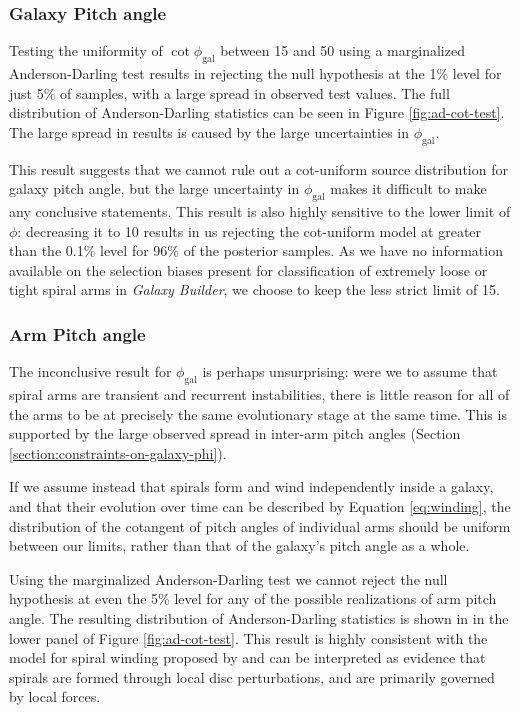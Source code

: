 \subsubsection{Galaxy Pitch angle}

Testing the uniformity of $\cot\phi_\mathrm{gal}$ between {15\degree} and {50\degree} using a marginalized Anderson-Darling test results in rejecting the null hypothesis at the 1\% level for just 5\% of samples, with a large spread in observed test values. The full distribution of Anderson-Darling statistics can be seen in Figure \ref{fig:ad-cot-test}. The large spread in results is caused by the large uncertainties in $\phi_\mathrm{gal}$.

This result suggests that we cannot rule out a cot-uniform source distribution for galaxy pitch angle, but the large uncertainty in $\phi_\mathrm{gal}$ makes it difficult to make any conclusive statements. This result is also highly sensitive to the lower limit of $\phi$: decreasing it to {10\degree} results in us rejecting the cot-uniform model at greater than the 0.1\% level for 96\% of the posterior samples. As we have no information available on the selection biases present for classification of extremely loose or tight spiral arms in \textit{Galaxy Builder}, we choose to keep the less strict limit of {15\degree}.

\subsubsection{Arm Pitch angle}
The inconclusive result for $\phi_\mathrm{gal}$ is perhaps unsurprising: were we to assume that spiral arms are transient and recurrent instabilities, there is little reason for all of the arms to be at precisely the same evolutionary stage at the same time. This is supported by the large observed spread in inter-arm pitch angles (Section \ref{section:constraints-on-galaxy-phi}).

If we assume instead that spirals form and wind independently inside a galaxy, and that their evolution over time can be described by Equation \ref{eq:winding}, the distribution of the cotangent of pitch angles of individual arms should be uniform between our limits, rather than that of the galaxy's pitch angle as a whole.

Using the marginalized Anderson-Darling test we cannot reject the null hypothesis at even the 5\% level for any of the possible realizations of arm pitch angle. The resulting distribution of Anderson-Darling statistics is shown in in the lower panel of Figure \ref{fig:ad-cot-test}. This result is highly consistent with the model for spiral winding proposed by \citet{2019arXiv190910291P} and can be interpreted as evidence that spirals are formed through local disc perturbations, and are primarily governed by local forces.

